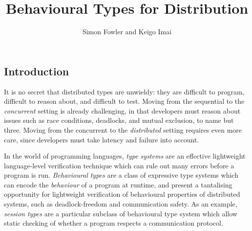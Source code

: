 \documentclass[
graybox,
envcountchap
]{svmult}
\begin{document}
\begin{bibunit}

	\title*{Behavioural Types for Distribution}
	\author{Simon Fowler and Keigo Imai}

	\maketitle

  \section{Introduction}

  It is no secret that distributed types are unwieldy: they are difficult to
  program, difficult to reason about, and difficult to test. Moving from the
  sequential to the \emph{concurrent} setting is already challenging, in that
  developers must reason about issues such as race conditions, deadlocks, and
  mutual exclusion, to name but three. Moving from
  the concurrent to the \emph{distributed} setting requires even more care,
  since developers must take latency and failure into account.

  In the world of programming languages, \emph{type systems} are an effective
  lightweight language-level verification technique which can rule out many
  errors before a program is run. \emph{Behavioural types} are a class of
  expressive type systems which can encode the \emph{behaviour} of a program at
  runtime, and present a tantalising opportunity for lightweight verification of
  behavioural properties of distributed systems, such as deadlock-freedom and
  communication safety. As an example, \emph{session types} are a particular
  subclass of behavioural type system which allow static checking of whether a
  program respects a communication protocol.


\end{bibunit}
\end{document}
